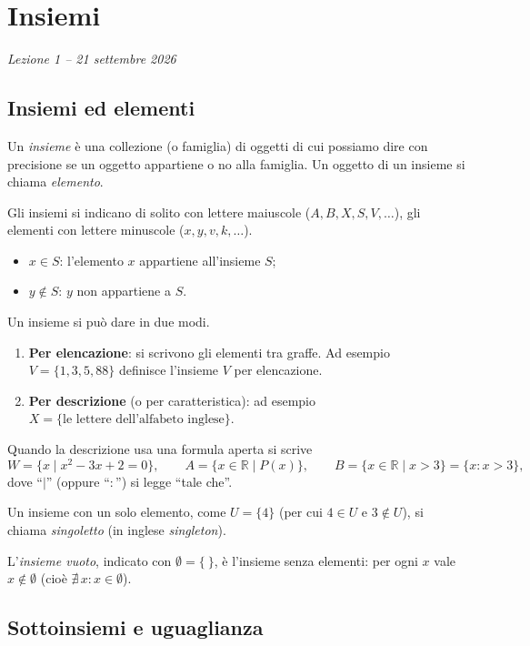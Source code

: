 \documentclass[11pt,a4paper]{article}
\begin{document}
\section[Insiemi (Lezione 1 -- 21 settembre 2026)]{Insiemi}
\noindent\emph{Lezione 1 -- 21 settembre 2026}
\subsection{Insiemi ed elementi}

\begin{definizione}
Un \emph{insieme} è una collezione (o famiglia) di oggetti di cui possiamo
dire con precisione se un oggetto appartiene o no alla famiglia. Un oggetto
di un insieme si chiama \emph{elemento}.
\end{definizione}

Gli insiemi si indicano di solito con lettere maiuscole ($A, B, X, S, V,
\dots$), gli elementi con lettere minuscole ($x, y, v, k, \dots$).
\begin{itemize}
    \item $x \in S$: l'elemento $x$ appartiene all'insieme $S$;
    \item $y \notin S$: $y$ non appartiene a $S$.
\end{itemize}

Un insieme si può dare in due modi.
\begin{enumerate}
    \item \textbf{Per elencazione}: si scrivono gli elementi tra graffe.
          Ad esempio $V = \{1, 3, 5, 88\}$ definisce l'insieme $V$ per
          elencazione.
    \item \textbf{Per descrizione} (o per caratteristica): ad esempio
          $X = \{\text{le lettere dell'alfabeto inglese}\}$.
\end{enumerate}

Quando la descrizione usa una formula aperta si scrive
\[
W = \{x \mid x^2 - 3x + 2 = 0\}, \qquad
A = \{x \in \mathbb{R} \mid P(x)\}, \qquad
B = \{x \in \mathbb{R} \mid x > 3\} = \{x : x > 3\},
\]
dove ``$\mid$'' (oppure ``$:$'') si legge ``tale che''.

Un insieme con un solo elemento, come $U = \{4\}$ (per cui $4 \in U$ e
$3 \notin U$), si chiama \emph{singoletto} (in inglese \emph{singleton}).

L'\emph{insieme vuoto}, indicato con $\emptyset = \{\ \}$, è l'insieme senza
elementi: per ogni $x$ vale $x \notin \emptyset$ (cioè
$\nexists\, x : x \in \emptyset$).

\subsection{Sottoinsiemi e uguaglianza}
\end{document}
